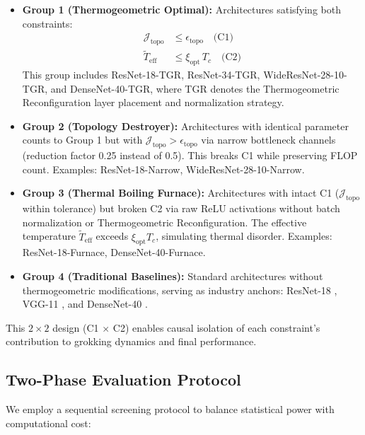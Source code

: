 \begin{itemize}
  \item \textbf{Group 1 (Thermogeometric Optimal):} 
    Architectures satisfying both constraints:
    \begin{align}
      \mathcal{J}_{\text{topo}} &\leq \epsilon_{\text{topo}} \quad \text{(C1)} \\
      \tilde{T}_{\text{eff}} &\leq \xi_{\text{opt}} \, T_c \quad \text{(C2)}
    \end{align}
    This group includes ResNet-18-TGR, ResNet-34-TGR, WideResNet-28-10-TGR, 
    and DenseNet-40-TGR, where TGR denotes the Thermogeometric Reconfiguration 
    layer placement and normalization strategy.
    
  \item \textbf{Group 2 (Topology Destroyer):}
    Architectures with identical parameter counts to Group 1 but with 
    $\mathcal{J}_{\text{topo}} > \epsilon_{\text{topo}}$ via narrow bottleneck 
    channels (reduction factor 0.25 instead of 0.5). This breaks C1 while 
    preserving FLOP count. Examples: ResNet-18-Narrow, WideResNet-28-10-Narrow.
    
  \item \textbf{Group 3 (Thermal Boiling Furnace):}
    Architectures with intact C1 ($\mathcal{J}_{\text{topo}}$ within tolerance) 
    but broken C2 via raw ReLU activations without batch normalization or 
    Thermogeometric Reconfiguration. The effective temperature $\tilde{T}_{\text{eff}}$ 
    exceeds $\xi_{\text{opt}} T_c$, simulating thermal disorder. 
    Examples: ResNet-18-Furnace, DenseNet-40-Furnace.
    
  \item \textbf{Group 4 (Traditional Baselines):}
    Standard architectures without thermogeometric modifications, serving as 
    industry anchors: ResNet-18 \citep{resnet}, VGG-11 \citep{vgg}, and DenseNet-40 
    \citep{densenet}.
\end{itemize}

This $2\times2$ design (C1 $\times$ C2) enables causal isolation of each 
constraint's contribution to grokking dynamics and final performance.

\subsection{Two-Phase Evaluation Protocol}
\label{sec:evaluation_protocol}

We employ a sequential screening protocol to balance statistical power with 
computational cost:

